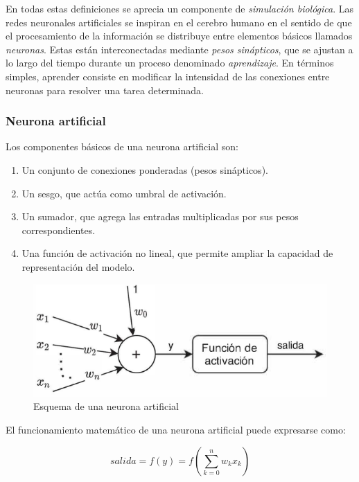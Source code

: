 En todas estas definiciones se aprecia un componente de \textit{simulación biológica}. Las redes neuronales artificiales se inspiran en el cerebro humano en el sentido de que el procesamiento de la información se distribuye entre elementos básicos llamados \textit{neuronas}. Estas están interconectadas mediante \textit{pesos sinápticos}, que se ajustan a lo largo del tiempo durante un proceso denominado \textit{aprendizaje}. En términos simples, aprender consiste en modificar la intensidad de las conexiones entre neuronas para resolver una tarea determinada.

\subsubsection*{Neurona artificial}

Los componentes básicos de una neurona artificial son:

\begin{enumerate}
    \item Un conjunto de conexiones ponderadas (pesos sinápticos).
    \item Un sesgo, que actúa como umbral de activación.
    \item Un sumador, que agrega las entradas multiplicadas por sus pesos correspondientes.
    \item Una función de activación no lineal, que permite ampliar la capacidad de representación del modelo.
\end{enumerate}

\begin{figure}[H]
    \centering
    \includegraphics[scale=0.7]{figuras/neurona.png}
    \caption{Esquema de una neurona artificial}
    \label{fig:neurona}
\end{figure}

El funcionamiento matemático de una neurona artificial puede expresarse como:

\begin{equation}
    salida = f(y) = f\left( \sum_{k=0}^{n} w_{k}x_{k} \right)
    \label{eq:neurona}
\end{equation}

